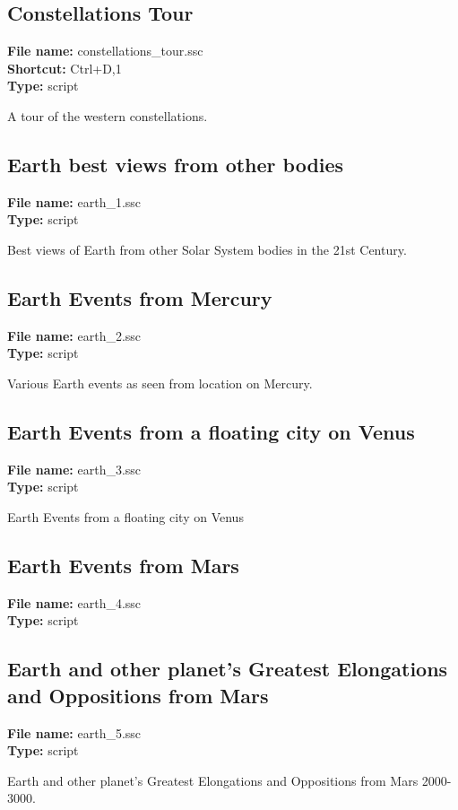 \subsection{Constellations Tour}
\textbf{File name:} constellations\_tour.ssc \\
\textbf{Shortcut:} Ctrl+D,1 \\
\textbf{Type:} script

A tour of the western constellations.

\subsection{Earth best views from other bodies}
\textbf{File name:} earth\_1.ssc \\
\textbf{Type:} script

Best views of Earth from other Solar System bodies in the 21st Century.

\subsection{Earth Events from Mercury}
\textbf{File name:} earth\_2.ssc \\
\textbf{Type:} script

Various Earth events as seen from location on Mercury.

\subsection{Earth Events from a floating city on Venus}
\textbf{File name:} earth\_3.ssc \\
\textbf{Type:} script

Earth Events from a floating city on Venus

\subsection{Earth Events from Mars}
\textbf{File name:} earth\_4.ssc \\
\textbf{Type:} script

\subsection{Earth and other planet's Greatest Elongations and Oppositions from Mars}
\textbf{File name:} earth\_5.ssc \\
\textbf{Type:} script

Earth and other planet's Greatest Elongations and Oppositions from Mars 2000-3000.

